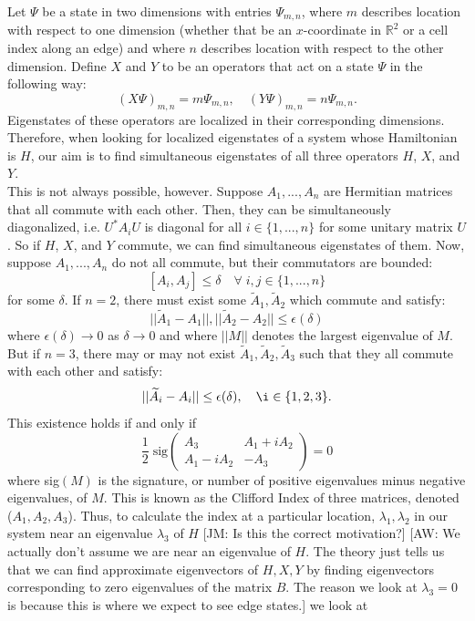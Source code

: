 \documentclass[a4paper]{article}
\newcommand{\aw}[1]{{\color{blue} [AW: #1]}}
\newcommand{\jm}[1]{{\color{red} [JM: #1]}}
\begin{document}
Let $\Psi$ be a state in two dimensions with entries $\Psi_{m,n}$, where $m$ describes location with respect to one dimension (whether that be an $x$-coordinate in $\mathbb{R}^2$ or a cell index along an edge) and where $n$ describes location with respect to the other dimension.
Define $X$ and $Y$ to be an operators that act on a state $\Psi$ in the following way:
$$(X \Psi)_{m,n} = m\Psi_{m,n}, \quad (Y \Psi)_{m,n} = n\Psi_{m,n}.$$
Eigenstates of these operators are localized in their corresponding dimensions.
Therefore, when looking for localized eigenstates of a system whose Hamiltonian is $H$, our aim is to find simultaneous eigenstates of all three operators $H$, $X$, and $Y$.\\
This is not always possible, however.
Suppose $A_1,...,A_n$ are Hermitian matrices that all commute with each other.
Then, they can be simultaneously diagonalized, i.e. $U^* A_i U$ is diagonal for all $i \in \{1,...,n\}$ for some unitary matrix $U$.
So if $H$, $X$, and $Y$ commute, we can find simultaneous eigenstates of them.
Now, suppose $A_1,...,A_n$ do not all commute, but their commutators are bounded:
$$[A_i,A_j] \leq \delta \quad \forall\; i,j \in \{1,...,n\}$$
for some $\delta$.
If $n = 2$, there must exist some $\widetilde{A}_1, \widetilde{A}_2$ which commute and satisfy:
$$||\widetilde{A}_1 - A_1||, ||\widetilde{A}_2 - A_2|| \leq \epsilon(\delta)$$
where $\epsilon(\delta) \rightarrow 0$ as $\delta \rightarrow 0$ and where $||M||$ denotes the largest eigenvalue of $M$.\\
But if $n = 3$, there may or may not exist $\widetilde{A}_1, \widetilde{A}_2, \widetilde{A}_3$ such that they all commute with each other and satisfy:
$$||\widetilde{A}_i - A_i|| \leq \epsilon(\delta), \quad \i \in \{1,2,3\}.$$
This existence holds if and only if
$$\frac{1}{2}\; \text{sig} \begin{pmatrix}
A_3 & A_1 + iA_2\\
A_1 - iA_2 & - A_3
\end{pmatrix} = 0$$
where sig$(M)$ is the signature, or number of positive eigenvalues minus negative eigenvalues, of $M$. This is known as the Clifford Index of three matrices, denoted ($A_1,A_2,A_3$).
Thus, to calculate the index at a particular location, $\lambda_1,\lambda_2$ in our system near an eigenvalue $\lambda_3$ of $H$ \jm{Is this the correct motivation?} \aw{We actually don't assume we are near an eigenvalue of $H$. The theory just tells us that we can find approximate eigenvectors of $H, X, Y$ by finding eigenvectors corresponding to zero eigenvalues of the matrix $B$. The reason we look at $\lambda_3 = 0$ is because this is where we expect to see edge states.} we look at
\end{document}
